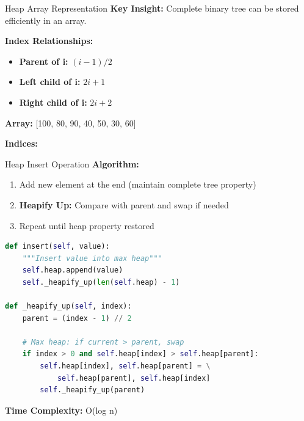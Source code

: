 \documentclass[aspectratio=169]{beamer}
\begin{document}
\begin{frame}{Heap Array Representation}
  \textbf{Key Insight:} Complete binary tree can be stored efficiently in an array.

  \vspace{0.3cm}
  \textbf{Index Relationships:}
  \begin{itemize}
    \item \textbf{Parent of i:} $(i-1) / 2$
    \item \textbf{Left child of i:} $2i + 1$
    \item \textbf{Right child of i:} $2i + 2$
  \end{itemize}

  \vspace{0.3cm}
  \begin{center}
  \end{center}

  \vspace{0.3cm}
  \textbf{Array:} [100, 80, 90, 40, 50, 30, 60]

  \textbf{Indices:}       
\end{frame}

\begin{frame}[fragile]{Heap Insert Operation}
  \textbf{Algorithm:}
  \begin{enumerate}
    \item Add new element at the end (maintain complete tree property)
    \item \textbf{Heapify Up:} Compare with parent and swap if needed
    \item Repeat until heap property restored
  \end{enumerate}

  \vspace{0.3cm}
  \begin{lstlisting}[language=Python, basicstyle=\ttfamily\small]
def insert(self, value):
    """Insert value into max heap"""
    self.heap.append(value)
    self._heapify_up(len(self.heap) - 1)

def _heapify_up(self, index):
    parent = (index - 1) // 2

    # Max heap: if current > parent, swap
    if index > 0 and self.heap[index] > self.heap[parent]:
        self.heap[index], self.heap[parent] = \
            self.heap[parent], self.heap[index]
        self._heapify_up(parent)
  \end{lstlisting}

  \textbf{Time Complexity:} O(log n)
\end{frame}
\end{document}
